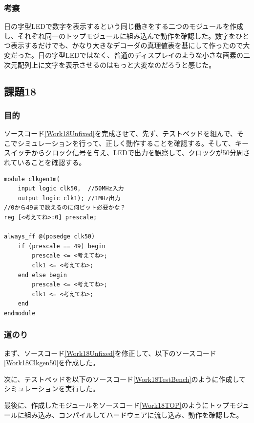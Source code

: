 \documentclass[a4paper]{jarticle}
\begin{document}
\subsubsection{考察}
日の字型LEDで数字を表示するという同じ働きをする二つのモジュールを作成し、それぞれ同一のトップモジュールに組み込んで動作を確認した。数字をひとつ表示するだけでも、かなり大きなデコーダの真理値表を基にして作ったので大変だった。日の字型LEDではなく、普通のディスプレイのような小さな画素の二次元配列上に文字を表示させるのはもっと大変なのだろうと感じた。
\subsection{課題18}
\subsubsection{目的}
ソースコード\ref{Work18Unfixed}を完成させて、先ず、テストベッドを組んで、そこでシミュレーションを行って、正しく動作することを確認する。そして、キースイッチからクロック信号を与え、LEDで出力を観察して、クロックが50分周されていることを確認する。
\begin{lstlisting}[caption=モジュール$clkgen1m$,label=Work18Unfixed]
module clkgen1m(
	input logic clk50,	//50MHz入力
	output logic clk1);	//1MHz出力
//0から49まで数えるのに何ビット必要かな？
reg [<考えてね>:0] prescale;

always_ff @(posedge clk50)
	if (prescale == 49) begin
		prescale <= <考えてね>;
		clk1 <= <考えてね>;
	end else begin
		prescale <= <考えてね>;
		clk1 <= <考えてね>;
	end
endmodule
\end{lstlisting}
\subsubsection{道のり}
まず、ソースコード\ref{Work18Unfixed}を修正して、以下のソースコード\ref{Work18Clkgen50}を作成した。

次に、テストベッドを以下のソースコード\ref{Work18TestBench}のように作成してシミュレーションを実行した。

最後に、作成したモジュールをソースコード\ref{Work18TOP}のようにトップモジュールに組み込み、コンパイルしてハードウェアに流し込み、動作を確認した。

\end{document}
